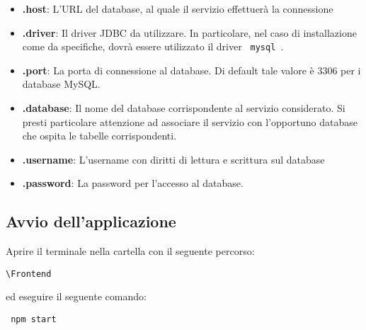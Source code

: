 \begin{itemize}
	\item \textbf{.host}: L'URL del database, al quale il servizio effettuerà la connessione
	\item \textbf{.driver}: Il driver JDBC da utilizzare. In particolare, nel caso di installazione come da specifiche, dovrà essere utilizzato il driver \verb| mysql |.
	\item \textbf{.port}: La porta di connessione al database. Di default tale valore è 3306 per i database MySQL.
	\item \textbf{.database}: Il nome del database corrispondente al servizio considerato. Si presti particolare attenzione ad associare il servizio con l'opportuno database che ospita le tabelle corrispondenti.
	\item \textbf{.username}: L'username con diritti di lettura e scrittura sul database
	\item \textbf{.password}: La password per l'accesso al database.
\end{itemize}

\subsection{Avvio dell'applicazione}
Aprire il terminale nella cartella con il seguente percorso:
\begin{center}
	\verb|\Frontend| 
\end{center} 
ed eseguire il seguente comando:
\begin{center}
	\verb| npm start|
\end{center}

